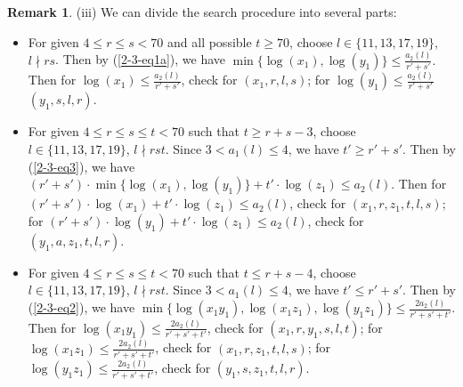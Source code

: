 \documentclass[a4paper, 12pt]{article}
\numberwithin{equation}{section}
\theoremstyle{definition}
\newtheorem{remark}[thm]{Remark}
\begin{document}
\begin{remark}
(iii) We can divide the search procedure into several parts:
\begin{itemize}
\item [(P1)] For given $4 \le r \le s < 70$ and all possible $t\ge 70$, choose $l\in \{11,13,17,19\}$, $l\nmid rs$. 
Then by (\ref{2-3-eq1a}), we have $\min\{\log(x_1), \log(y_1)\} \le \frac{a_2(l)}{r' + s'}.$ 
Then for $\log(x_1) \le \frac{a_2(l)}{r' + s'}$, check for $(x_1, r, l, s)$;
for $\log(y_1) \le \frac{a_2(l)}{r' + s'}$  $(y_1, s, l, r)$.

\item [(P2)] For given $4\le r\le s\le t < 70$ such that $t \ge r + s - 3$, choose $l\in \{11,13,17,19\}$, $l\nmid rst$. Since $3 < a_1(l) \le 4$, we have $t' \ge r' + s'$.
Then by (\ref{2-3-eq3}), we have $(r' + s') \cdot \min\{\log(x_1), \log(y_1) \} + t' \cdot \log(z_1) \le a_2(l)$. 
Then for $(r' + s') \cdot \log(x_1) + t' \cdot \log(z_1) \le a_2(l)$, check for $(x_1, r, z_1, t, l, s)$;
for $(r' + s') \cdot \log(y_1) + t' \cdot \log(z_1) \le a_2(l)$, check for $(y_1, a, z_1, t, l, r)$.

\item [(P3)] For given $4\le r\le s\le t < 70$ such that $t \le r + s - 4$, choose $l\in \{11,13,17,19\}$, $l\nmid rst$. Since $3 < a_1(l) \le 4$, we have $t' \le r' + s'$.
Then by (\ref{2-3-eq2}), we have $\min\{\log(x_1 y_1), \log(x_1 z_1), \log(y_1 z_1) \} \le  \frac{2a_2(l)}{ r' + s' + t' }$.
Then for $\log(x_1 y_1) \le \frac{2a_2(l)}{ r' + s' + t' }$, check for $(x_1, r, y_1, s, l, t)$;
for $\log(x_1 z_1) \le \frac{2a_2(l)}{ r' + s' + t' }$, check for $(x_1, r, z_1, t, l, s)$;
for $\log(y_1 z_1) \le \frac{2a_2(l)}{ r' + s' + t' }$, check for $(y_1, s, z_1, t, l, r)$.
\end{itemize}

\end{remark}
\end{document}
